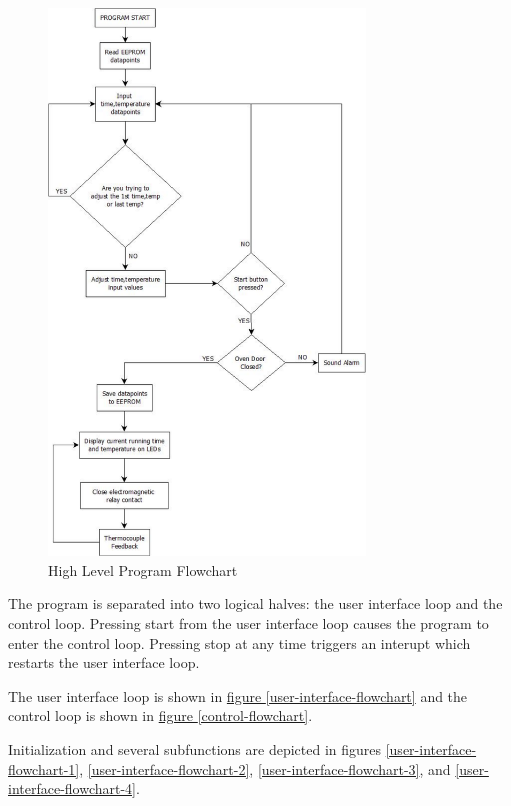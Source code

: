 \documentclass[10pt, twocolumn]{article}
\begin{document}
\begin{figure}
	\centering
	\includegraphics[width=0.75\textwidth]{high-level-program-flowchart.pdf}
	\caption{High Level Program Flowchart}
	\label{high-level-program-flowchart}
\end{figure}

The program is separated into two logical halves:
the user interface loop and the control loop.
Pressing start from the user interface loop causes the
program to enter the control loop.
Pressing stop at any time triggers an interupt which
restarts the user interface loop.

The user interface loop is shown in
\hyperref[user-interface-flowchart]{figure \ref{user-interface-flowchart}}
and the control loop is shown in
\hyperref[control-flowchart]{figure \ref{control-flowchart}}.

Initialization and several subfunctions are depicted in figures
\ref{user-interface-flowchart-1},
\ref{user-interface-flowchart-2},
\ref{user-interface-flowchart-3}, and
\ref{user-interface-flowchart-4}.
\end{document}
